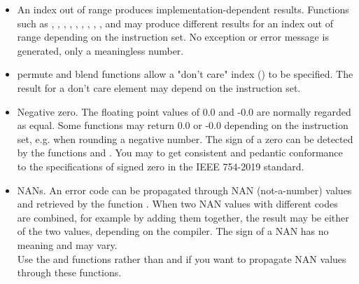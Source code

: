 \documentclass[vcl_manual.tex]{subfiles}
\begin{document}
\begin{itemize}
  \item An index out of range produces implementation-dependent results. Functions such as 
  , , , , , , , , , and  may produce different results for an index out of range depending on the instruction set. No exception or error message is generated, only a meaningless number.
  
  \item permute and blend functions allow a "don't care" index () to be specified. The result for a don't care element may depend on the instruction set.
  
  \item Negative zero. The floating point values of 0.0 and -0.0 are normally regarded as equal. Some functions may return 0.0 or -0.0 depending on the instruction set, e.g. when rounding a negative number. The sign of a zero can be detected by the functions  and .
You may {}  {} to get consistent and pedantic conformance to the specifications of signed zero in the IEEE 754-2019 standard.
  
  \item NANs. An error code can be propagated through NAN (not-a-number) values and retrieved by the function . When two NAN values with different codes are combined, for example by adding them together, the result may be either of the two values, depending on the compiler. The sign of a NAN has no meaning and may vary. \\
  Use the  and  functions rather than  and  if you want to propagate NAN values through these functions.
  
\end{itemize}
\end{document}
